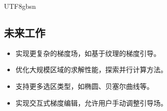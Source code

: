 \documentclass[11pt,a4paper]{article}
\begin{document}
\begin{CJK*}{UTF8}{gbsn}
\subsection{未来工作}
\begin{itemize}
    \item 实现更复杂的梯度场，如基于纹理的梯度引导。
    \item 优化大规模区域的求解性能，探索并行计算方法。
    \item 支持更多选区类型，如椭圆、贝塞尔曲线等。
    \item 实现交互式梯度编辑，允许用户手动调整引导场。
\end{itemize}

\end{CJK*}
\end{document}
